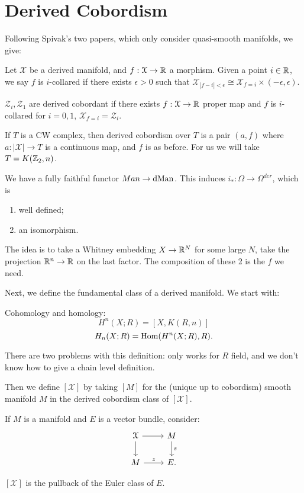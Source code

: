 \section{Derived Cobordism}
Following Spivak's two papers, which only consider quasi-smooth manifolds, we give:
\begin{defin}
Let $\mathcal{X}$ be a derived manifold, and $f:\mathcal{X} \to \mathbb R$ a morphism. Given a point $i\in \mathbb R$, we say $f$ is $i$-collared
if there exists $\epsilon>0$ such that $\mathcal{X}_{|f-i|<\epsilon} \cong \mathcal{X}_{f=i} \times (-\epsilon, \epsilon)$.

$\mathcal{Z}_i, \mathcal{Z}_1$ are derived cobordant if there exists $f: \mathcal{X} \to \mathbb R$ proper map and $f$ is $i$-collared
for $i=0,1$, $\mathcal{X}_{f=i} = \mathcal{Z}_i$.
\end{defin}

\begin{rem}
If $T$ is a CW complex, then derived cobordism over $T$ is a pair $(a,f)$ where $a: |\mathcal{X}| \to T$ is a continuous map,
and $f$ is as before. For us we will take $T = K(\mathbb Z_2, n)$.
\end{rem}

\begin{prop}
We have a fully faithful functor $Man \to \operatorname{dMan}$. This induces $i_* : \Omega \to \Omega^{der}$, which is
\begin{enumerate}
\item well defined;
\item an isomorphism.
\end{enumerate}
\end{prop}

The idea is to take a Whitney embedding $X \to \mathbb R^N$ for some large $N$, take the projection $\mathbb R^n \to \mathbb R$ on the last factor.
The composition of these 2 is the $f$ we need.

Next, we define the fundamental class of a derived manifold. We start with:
\begin{defin}
Cohomology and homology:
\[ H^n(X;R) = [X,K(R,n)] 	\]
\[	H_n(X;R) = \operatorname{Hom}(H^n(X;R), R).	\]
\end{defin}

There are two problems with this definition: only works for $R$ field, and we don't know how to give a chain level definition.

Then we define $[\mathcal{X}]$ by taking $[M]$ for the (unique up to cobordism) smooth manifold $M$ in the derived cobordism class
of $[\mathcal{X}]$.

If $M$ is a manifold and $E$ is a vector bundle, consider:
\[
\begin{tikzcd}
\mathcal{X}\arrow{d}\arrow{r} & M\arrow{d}{s} \\ M\arrow{r}{z} & E.
\end{tikzcd}
\]
\begin{prop}
$[\mathcal{X}]$ is the pullback of the Euler class of $E$.
\end{prop}

